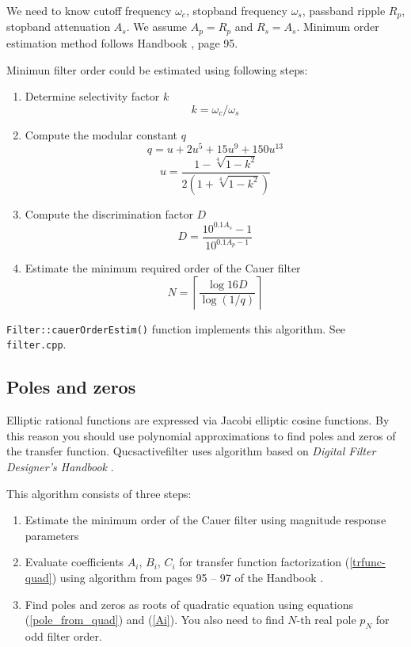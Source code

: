We need to know cutoff frequency $\omega_c$, stopband frequency $\omega_s$,
passband ripple $R_p$, stopband attenuation $A_s$. We assume $A_p=R_p$ and
$R_s=A_s$. Minimum order estimation method follows Handbook
\cite{dfd_handbook}, page 95.

Minimun filter order could be estimated using following steps:

\begin{enumerate}
 \item Determine selectivity factor $k$
 \begin{equation}
  k = \omega_c/\omega_s \label{k_cauer}
 \end{equation}
 \item Compute the modular constant $q$
 \begin{equation}
  q = u +2u^5+15u^9+150u^{13} \label{q_cauer}
 \end{equation}
 \begin{equation}
  u = \frac{1-\sqrt[4]{1-k^2}}{2(1+\sqrt[4]{1-k^2})}
 \end{equation}
\item Compute the discrimination factor $D$
\begin{equation}
 D = \frac{10^{0.1A_s}-1}{10^{0.1A_p-1}}
\end{equation}
\item Estimate the minimum required order of the Cauer filter
\begin{equation}
 N = \left\lceil\frac{\log 16D}{\log(1/q)}\right\rceil \label{cauer-order}
\end{equation}

\end{enumerate}

\verb|Filter::cauerOrderEstim()| function implements this algorithm. See
\verb|filter.cpp|.

\subsection{Poles and zeros}

Elliptic rational functions are expressed via Jacobi elliptic cosine functions.
By this reason you should use polynomial approximations to find poles and zeros
of the transfer function. Qucsactivefilter uses algorithm based on 
\emph{Digital Filter Designer's Handbook} \cite{dfd_handbook}.

This algorithm consists of three steps:
\begin{enumerate}
 \item Estimate the minimum order of the Cauer filter using magnitude
response parameters
 \item Evaluate coefficients $A_i$, $B_i$, $C_i$ for transfer function
factorization (\ref{trfunc-quad}) using algorithm from pages 95
-- 97 of the Handbook \cite{dfd_handbook}.
 \item Find poles and zeros as roots of quadratic equation using equations
(\ref{pole_from_quad}) and (\ref{Ai}). You also need to find $N$-th real pole
$p_N$ for odd filter order.
\end{enumerate}


